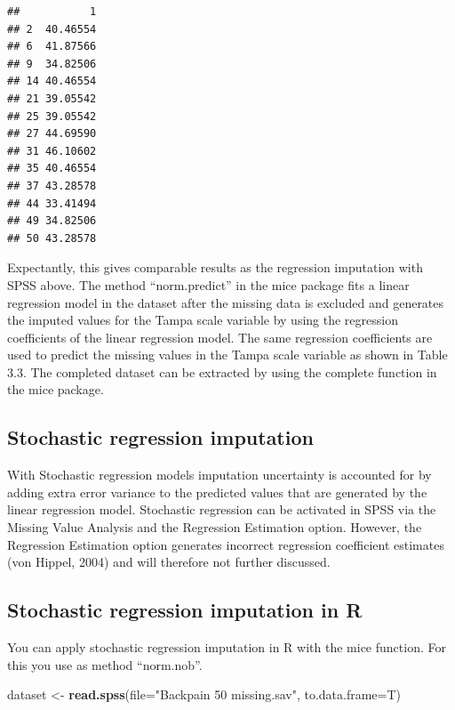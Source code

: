 \documentclass[]{book}
\newenvironment{Shaded}{\begin{snugshade}}{\end{snugshade}}
\newcommand{\KeywordTok}[1]{\textcolor[rgb]{0.13,0.29,0.53}{\textbf{#1}}}
\newcommand{\DataTypeTok}[1]{\textcolor[rgb]{0.13,0.29,0.53}{#1}}
\newcommand{\StringTok}[1]{\textcolor[rgb]{0.31,0.60,0.02}{#1}}
\newcommand{\NormalTok}[1]{#1}
\theoremstyle{definition}
\theoremstyle{definition}
\theoremstyle{definition}
\theoremstyle{remark}
\begin{document}
\begin{verbatim}
##           1
## 2  40.46554
## 6  41.87566
## 9  34.82506
## 14 40.46554
## 21 39.05542
## 25 39.05542
## 27 44.69590
## 31 46.10602
## 35 40.46554
## 37 43.28578
## 44 33.41494
## 49 34.82506
## 50 43.28578
\end{verbatim}

Expectantly, this gives comparable results as the regression imputation
with SPSS above. The method ``norm.predict'' in the mice package fits a
linear regression model in the dataset after the missing data is
excluded and generates the imputed values for the Tampa scale variable
by using the regression coefficients of the linear regression model. The
same regression coefficients are used to predict the missing values in
the Tampa scale variable as shown in Table 3.3. The completed dataset
can be extracted by using the complete function in the mice package.

\subsection{Stochastic regression
imputation}\label{stochastic-regression-imputation}

With Stochastic regression models imputation uncertainty is accounted
for by adding extra error variance to the predicted values that are
generated by the linear regression model. Stochastic regression can be
activated in SPSS via the Missing Value Analysis and the Regression
Estimation option. However, the Regression Estimation option generates
incorrect regression coefficient estimates (von Hippel, 2004) and will
therefore not further discussed.

\subsection{Stochastic regression imputation in
R}\label{stochastic-regression-imputation-in-r}

You can apply stochastic regression imputation in R with the mice
function. For this you use as method ``norm.nob''.

\begin{Shaded}
\begin{Highlighting}[]
\NormalTok{dataset <-}\StringTok{ }\KeywordTok{read.spss}\NormalTok{(}\DataTypeTok{file=}\StringTok{"Backpain 50 missing.sav"}\NormalTok{, }\DataTypeTok{to.data.frame=}\NormalTok{T)}
\end{Highlighting}
\end{Shaded}
\end{document}
